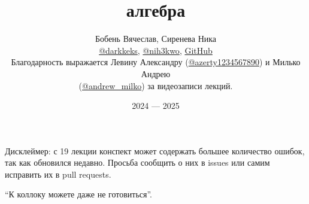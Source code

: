 \documentclass[a4paper]{article}
\title{\HugeЛинейная алгебра}
\author{
	Бобень Вячеслав, Сиренева Ника \\
	\href{https://teleg.run/darkkeks}{@darkkeks},
    \href{https://t.me/nih3kwo}{@nih3kwo},
    \href{https://github.com/LoDThe/hse-tex}{GitHub}\\
    Благодарность выражается Левину Александру (\href{https://teleg.run/azerty1234567890}{@azerty1234567890}) и Милько Андрею \\
    (\href{https://teleg.run/andrew_milko}{@andrew\_milko}) за видеозаписи лекций.
}
\date{2024 --- 2025}
\begin{document}
    \maketitle

    \begin{center}
        Дисклеймер: с 19 лекции конспект может содержать большее количество ошибок, так как обновился недавно. Просьба сообщить о них в issues или самим исправить их в pull requests.
    \end{center}

    \epigraph{
        ``К коллоку можете даже не готовиться''.
    }{}

    \tableofcontents

    \newpage

    
    
    
    
    
    
    
    
    
    
    
    
    
    
    
    
    
    
    
    
    
    
    
    
    
    
    
    
    
    
\end{document}
